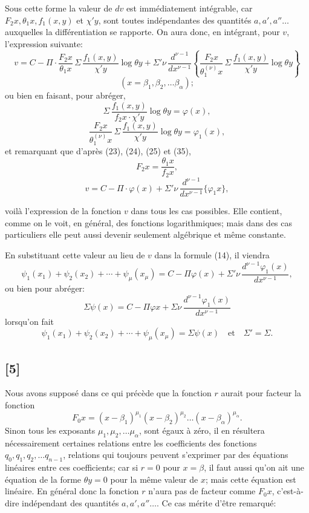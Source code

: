 \documentclass{article}
\begin{document}
Sous cette forme la valeur de $dv$ est immédiatement intégrable, car $F_2 x, \theta_1 x, f_1(x, y)$ et $\chi' y$, sont toutes indépendantes des quantités $a, a', a'' \ldots$ auxquelles la différentiation se rapporte. On aura donc, en intégrant, pour $v$, l'expression suivante:
\[ v = C - \Pi \cdot \frac{F_2 x}{\theta_1 x}\,\Sigma\,\frac{f_1(x, y)}{\chi' y}\log\theta y + \Sigma' \nu\,\frac{d^{\nu-1}}{dx^{\nu-1}} \left\{ \frac{F_2 x}{\theta_1^{(\nu)} x}\,\Sigma\,\frac{f_1(x, y)}{\chi' y}\log\theta y \right\} \tag{37} \]
\[ (x = \beta_1, \beta_2, \ldots \beta_\alpha); \]
ou bien en faisant, pour abréger,
\[ \Sigma\,\frac{f_1(x, y)}{f_2 x \cdot \chi' y}\log\theta y = \varphi(x), \tag{38} \]
\[ \frac{F_2 x}{\theta_1^{(\nu)} x}\,\Sigma\,\frac{f_1(x, y)}{\chi' y}\log\theta y = \varphi_1(x), \]
et remarquant que d'après (23), (24), (25) et (35),
\[ F_2 x = \frac{\theta_1 x}{f_2 x}, \]
\[ v = C - \Pi \cdot \varphi(x) + \Sigma' \nu\,\frac{d^{\nu-1}}{dx^{\nu-1}} \{\varphi_1 x\}, \tag{39} \]

voilà l'expression de la fonction $v$ dans tous les cas possibles. Elle contient, comme on le voit, en général, des fonctions logarithmiques; mais dans des cas particuliers elle peut aussi devenir seulement algébrique et même constante.

En substituant cette valeur au lieu de $v$ dans la formule (14), il viendra
\[ \psi_1(x_1) + \psi_2(x_2) + \cdots + \psi_\mu(x_\mu) = C - \Pi\varphi(x) + \Sigma' \nu\,\frac{d^{\nu-1}\varphi_1(x)}{dx^{\nu-1}}, \tag{40} \]
ou bien pour abréger:
\[ \Sigma\psi(x) = C - \Pi\varphi x + \Sigma\nu\,\frac{d^{\nu-1}\varphi_1(x)}{dx^{\nu-1}} \tag{41} \]
lorsqu'on fait
\[ \psi_1(x_1) + \psi_2(x_2) + \cdots + \psi_\mu(x_\mu) = \Sigma\psi(x) \quad \text{et} \quad \Sigma' = \Sigma. \tag{42} \]

\subsection*{[5]}

Nous avons supposé dans ce qui précède que la fonction $r$ aurait pour facteur la fonction
\[ F_0 x = (x-\beta_1)^{\mu_1}(x-\beta_2)^{\mu_2} \ldots (x-\beta_\alpha)^{\mu_\alpha}. \]
Sinon tous les exposants $\mu_1, \mu_2, \ldots \mu_\alpha$, sont égaux à zéro, il en résultera nécessairement certaines relations entre les coefficients des fonctions $q_0, q_1, q_2, \ldots q_{n-1}$, relations qui toujours peuvent s'exprimer par des équations linéaires entre ces coefficients; car
si $r = 0$ pour $x = \beta$, il faut aussi qu'on ait une équation de la forme $\theta y = 0$ pour la même valeur de $x$; mais cette équation est linéaire. En général donc la fonction $r$ n'aura pas de facteur comme $F_0 x$, c'est-à-dire indépendant des quantités $a, a', a'' \ldots$. Ce cas mérite d'être remarqué:
\end{document}
